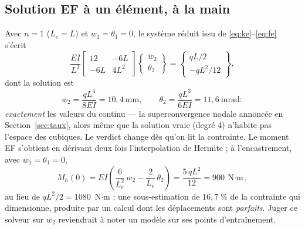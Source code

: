 \documentclass[10pt,journal]{IEEEtran}
\begin{document}
\subsection{Solution EF à un élément, à la main}
Avec $n=1$ ($L_e=L$) et $w_1=\theta_1=0$, le système réduit issu de \eqref{eq:ke}--\eqref{eq:fe} s'écrit
\begin{equation}
\frac{EI}{L^3}
\begin{bmatrix} 12 & -6L \\ -6L & 4L^2 \end{bmatrix}
\begin{Bmatrix} w_2 \\ \theta_2 \end{Bmatrix}
=
\begin{Bmatrix} qL/2 \\ -qL^2/12 \end{Bmatrix},
\label{eq:reduit}
\end{equation}
dont la solution est
\begin{equation}
w_2 = \frac{qL^4}{8EI} = 10{,}4~\text{mm}, \qquad
\theta_2 = \frac{qL^3}{6EI} = 11{,}6~\text{mrad} :
\end{equation}
\emph{exactement} les valeurs du continu --- la superconvergence nodale annoncée en Section~\ref{sec:taux}, alors même que la solution vraie (degré 4) n'habite pas l'espace des cubiques. Le verdict change dès qu'on lit la contrainte. Le moment EF s'obtient en dérivant deux fois l'interpolation de Hermite ; à l'encastrement, avec $w_1=\theta_1=0$,
\begin{equation}
M_h(0) = EI\left(\frac{6}{L_e^2}\,w_2 - \frac{2}{L_e}\,\theta_2\right)
= \frac{5\,qL^2}{12} = 900~\text{N$\cdot$m},
\label{eq:mh}
\end{equation}
au lieu de $qL^2/2=1080$~N$\cdot$m : une sous-estimation de $16{,}7\;\%$ de la contrainte qui dimensionne, produite par un calcul dont les déplacements sont \emph{parfaits}. Juger ce solveur sur $w_2$ reviendrait à noter un modèle sur ses points d'entraînement.
\end{document}
